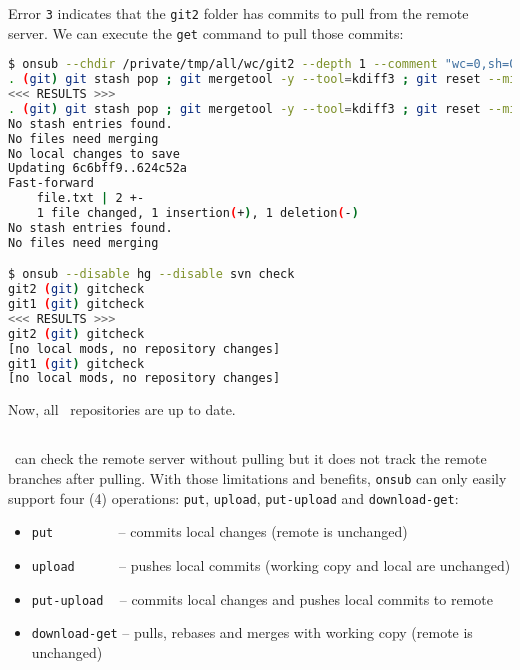 Error \lstinline{3} indicates that the \lstinline{git2} folder has commits to pull from the remote server. We can execute the \lstinline{get} command to pull those commits:

\begin{snugshade}
\begin{lstlisting}[language=bash]	
$ onsub --chdir /private/tmp/all/wc/git2 --depth 1 --comment "wc=0,sh=0,out=0,in=1" {get}
. (git) git stash pop ; git mergetool -y --tool=kdiff3 ; git reset --mixed ; git stash clear ; git stash ; git merge origin/master ; git stash pop ; git mergetool -y --tool=kdiff3 ; git reset --mixed ; git stash clear
<<< RESULTS >>>
. (git) git stash pop ; git mergetool -y --tool=kdiff3 ; git reset --mixed ; git stash clear ; git stash ; git merge origin/master ; git stash pop ; git mergetool -y --tool=kdiff3 ; git reset --mixed ; git stash clear
No stash entries found.
No files need merging
No local changes to save
Updating 6c6bff9..624c52a
Fast-forward
	file.txt | 2 +-
	1 file changed, 1 insertion(+), 1 deletion(-)
No stash entries found.
No files need merging

$ onsub --disable hg --disable svn check
git2 (git) gitcheck
git1 (git) gitcheck
<<< RESULTS >>>
git2 (git) gitcheck
[no local mods, no repository changes]
git1 (git) gitcheck
[no local mods, no repository changes]
\end{lstlisting}
\end{snugshade}

Now, all \Git\ repositories are up to date.

\subsection{\Mercurial}

\Mercurial\ can check the remote server without pulling but it does not track the remote branches after pulling. With those limitations and benefits, \lstinline{onsub} can only easily support four (4) operations: \lstinline{put}, \lstinline{upload}, \lstinline{put-upload} and \lstinline{download-get}:

\begin{itemize}
\item \lstinline{put} ~~~~~~~~ -- commits local changes (remote is unchanged)
\item \lstinline{upload} ~~~~~ -- pushes local commits (working copy and local are unchanged)
\item \lstinline{put-upload} ~ -- commits local changes and pushes local commits to remote
\item \lstinline{download-get} -- pulls, rebases and merges with working copy (remote is unchanged)
\end{itemize}

